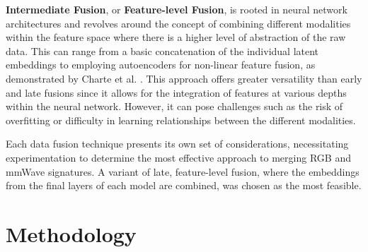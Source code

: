 \documentclass{mpaper}
\begin{document}
\textbf{Intermediate Fusion}, or \textbf{Feature-level Fusion}, is rooted in neural network architectures and revolves around the concept of combining different modalities within the feature space where there is a higher level of abstraction of the raw data. This can range from a basic concatenation of the individual latent embeddings to employing autoencoders for non-linear feature fusion, as demonstrated by Charte et al. \cite{charte2018practical}. This approach offers greater versatility than early and late fusions since it allows for the integration of features at various depths within the neural network. However, it can pose challenges such as the risk of overfitting or difficulty in learning relationships between the different modalities.

Each data fusion technique presents its own set of considerations, necessitating experimentation to determine the most effective approach to merging RGB and mmWave signatures. A variant of late, feature-level fusion, where the embeddings from the final layers of each model are combined, was chosen as the most feasible. 


\section{Methodology}
\end{document}
